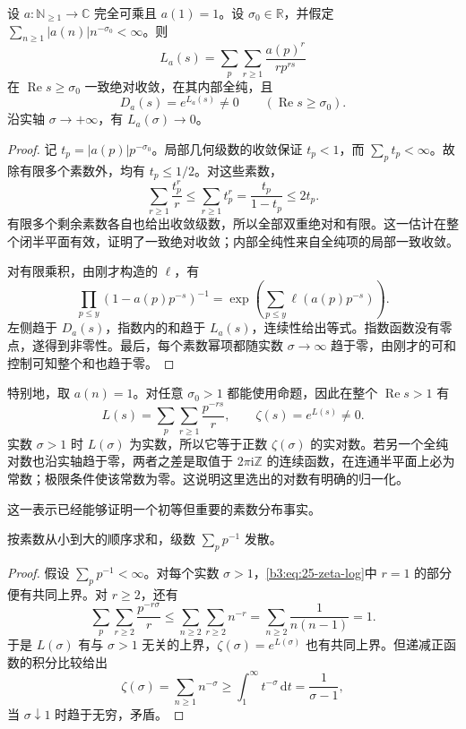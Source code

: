 \begin{proposition}[完全可乘级数的全纯对数]\label{b3:prop:25-euler-log}
设 \(a:\mathbb N_{\ge1}\to\mathbb C\) 完全可乘且 \(a(1)=1\)。设 \(\sigma_0\in\mathbb R\)，并假定 \(\sum_{n\ge1}|a(n)|n^{-\sigma_0}<\infty\)。则
\[
 L_a(s)=\sum_p\sum_{r\ge1}\frac{a(p)^r}{r p^{rs}}
\]
在 \(\operatorname{Re}s\ge\sigma_0\) 一致绝对收敛，在其内部全纯，且
\[
 D_a(s)=e^{L_a(s)}\ne0\qquad(\operatorname{Re}s\ge\sigma_0).
\]
沿实轴 \(\sigma\to+\infty\)，有 \(L_a(\sigma)\to0\)。
\end{proposition}
\begin{proof}
记 \(t_p=|a(p)|p^{-\sigma_0}\)。局部几何级数的收敛保证 \(t_p<1\)，而 \(\sum_p t_p<\infty\)。故除有限多个素数外，均有 \(t_p\le1/2\)。对这些素数，
\[
 \sum_{r\ge1}\frac{t_p^r}{r}
 \le\sum_{r\ge1}t_p^r
 =\frac{t_p}{1-t_p}\le2t_p.
\]
有限多个剩余素数各自也给出收敛级数，所以全部双重绝对和有限。这一估计在整个闭半平面有效，证明了一致绝对收敛；内部全纯性来自全纯项的局部一致收敛。

对有限乘积，由刚才构造的 \(\ell\)，有
\[
 \prod_{p\le y}(1-a(p)p^{-s})^{-1}
 =\exp\left(\sum_{p\le y}\ell(a(p)p^{-s})\right).
\]
左侧趋于 \(D_a(s)\)，指数内的和趋于 \(L_a(s)\)，连续性给出等式。指数函数没有零点，遂得到非零性。最后，每个素数幂项都随实数 \(\sigma\to\infty\) 趋于零，由刚才的可和控制可知整个和也趋于零。
\end{proof}

特别地，取 \(a(n)=1\)。对任意 \(\sigma_0>1\) 都能使用命题，因此在整个 \(\operatorname{Re}s>1\) 有
\begin{equation}\label{b3:eq:25-zeta-log}
 L(s)=\sum_p\sum_{r\ge1}\frac{p^{-rs}}r,\qquad
 \zeta(s)=e^{L(s)}\ne0.
\end{equation}
实数 \(\sigma>1\) 时 \(L(\sigma)\) 为实数，所以它等于正数 \(\zeta(\sigma)\) 的实对数。若另一个全纯对数也沿实轴趋于零，两者之差是取值于 \(2\pi\mathrm i\mathbb Z\) 的连续函数，在连通半平面上必为常数；极限条件使该常数为零。这说明这里选出的对数有明确的归一化。

这一表示已经能够证明一个初等但重要的素数分布事实。

\begin{proposition}[素数倒数和的发散]\label{b3:prop:25-prime-reciprocals}
按素数从小到大的顺序求和，级数 \(\sum_p p^{-1}\) 发散。
\end{proposition}
\begin{proof}
假设 \(\sum_p p^{-1}<\infty\)。对每个实数 \(\sigma>1\)，\eqref{b3:eq:25-zeta-log}中 \(r=1\) 的部分便有共同上界。对 \(r\ge2\)，还有
\[
 \sum_p\sum_{r\ge2}\frac{p^{-r\sigma}}r
 \le\sum_{n\ge2}\sum_{r\ge2}n^{-r}
 =\sum_{n\ge2}\frac1{n(n-1)}=1.
\]
于是 \(L(\sigma)\) 有与 \(\sigma>1\) 无关的上界，\(\zeta(\sigma)=e^{L(\sigma)}\) 也有共同上界。但递减正函数的积分比较给出
\[
 \zeta(\sigma)=\sum_{n\ge1}n^{-\sigma}
 \ge\int_1^\infty t^{-\sigma}\,\mathrm dt
 =\frac1{\sigma-1},
\]
当 \(\sigma\downarrow1\) 时趋于无穷，矛盾。
\end{proof}

